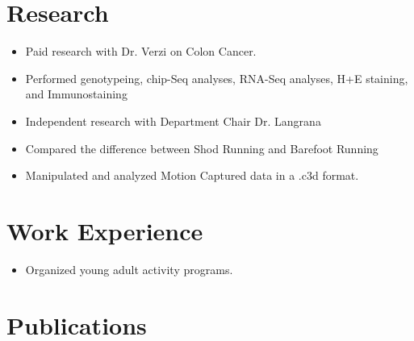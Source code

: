 \documentclass[letterpaper]{deedy-resume} %
\begin{document}
\begin{minipage}[t]{0.66\textwidth} %



\section{Research}

\begin{itemize}
\item Paid research with Dr. Verzi on Colon Cancer.
\item Performed genotypeing, chip-Seq analyses, RNA-Seq analyses, H+E staining, and Immunostaining	
\end{itemize}
\sectionspace %


\begin{itemize}
\item Independent research with Department Chair Dr. Langrana 
\item Compared the difference between Shod Running and Barefoot Running	
\item Manipulated and analyzed Motion Captured data in a .c3d format. 
\end{itemize}

\sectionspace %

\section{Work Experience}
\begin{itemize}
\item Organized young adult activity programs.
\end{itemize}


\section{Publications}

\end{minipage}
\end{document}
